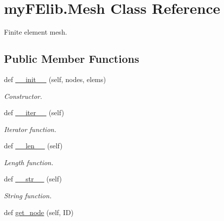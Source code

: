 \hypertarget{classmyFElib_1_1Mesh}{}\section{my\+F\+Elib.\+Mesh Class Reference}
\label{classmyFElib_1_1Mesh}


Finite element mesh.  


\subsection*{Public Member Functions}
\begin{DoxyCompactItemize}
\item 
def \mbox{\hyperlink{classmyFElib_1_1Mesh_a0fc9ee65d24f94c8f93a65ed9b478403}{\+\_\+\+\_\+init\+\_\+\+\_\+}} (self, nodes, elems)
\begin{DoxyCompactList}\small\item\em Constructor. \end{DoxyCompactList}\item 
\mbox{\label{classmyFElib_1_1Mesh_a591fe571f64e9065bbef8b4b5fecbc41}} 
def \mbox{\hyperlink{classmyFElib_1_1Mesh_a591fe571f64e9065bbef8b4b5fecbc41}{\+\_\+\+\_\+iter\+\_\+\+\_\+}} (self)
\begin{DoxyCompactList}\small\item\em Iterator function. \end{DoxyCompactList}\item 
\mbox{\label{classmyFElib_1_1Mesh_ac854cddcae8931d5075c691bc1eefcc3}} 
def \mbox{\hyperlink{classmyFElib_1_1Mesh_ac854cddcae8931d5075c691bc1eefcc3}{\+\_\+\+\_\+len\+\_\+\+\_\+}} (self)
\begin{DoxyCompactList}\small\item\em Length function. \end{DoxyCompactList}\item 
\mbox{\label{classmyFElib_1_1Mesh_ab6ed05c303f6434610dead0b28dfdd50}} 
def \mbox{\hyperlink{classmyFElib_1_1Mesh_ab6ed05c303f6434610dead0b28dfdd50}{\+\_\+\+\_\+str\+\_\+\+\_\+}} (self)
\begin{DoxyCompactList}\small\item\em String function. \end{DoxyCompactList}\item 
def \mbox{\hyperlink{classmyFElib_1_1Mesh_a731a484349d4f45154745a8d905a417b}{get\+\_\+node}} (self, ID)

\end{DoxyCompactItemize}
